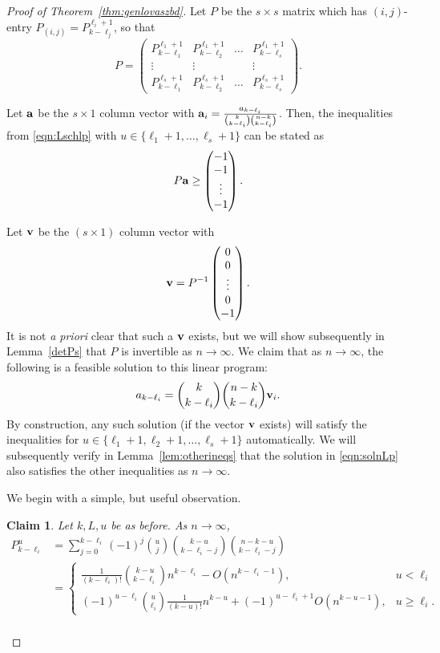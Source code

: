 \documentclass[11pt]{article}
\newtheorem{claim}[theorem]{Claim}
\theoremstyle{definition}
\theoremstyle{remark}
\begin{document}
\begin{proof}[Proof of Theorem~\ref{thm:genlovaszbd}]
Let $P$ be the $s\times{s}$ matrix which has $(i, j)$-entry $P_{(i, j)} = P_{k-\ell_j}^{\ell_{i}+1}$, so that \[P = \begin{pmatrix}P_{k-\ell_1}^{\ell_1+1} & P_{k-\ell_2}^{\ell_1+1}  & \ldots & P_{k-\ell_s}^{\ell_1+1} \\ \vdots & \vdots & &\vdots \\ P_{k-\ell_1}^{\ell_s+1} & P_{k-\ell_2}^{\ell_s+1} & \ldots  & P_{k-\ell_s}^{\ell_s+1}\end{pmatrix}.\]

Let ${\bf a}$ be the $s\times 1$ column vector with ${\bf a}_{i} = \frac{a_{k-\ell_i}}{\binom{k}{k-\ell_i}\binom{n-k}{k-\ell_i}}$.  Then, the inequalities from \eqref{eqn:Lschlp} with $u\in \{\ell_1+1, \ldots, \ell_s+1\}$ can be stated as 
\[P{\bf a} \ge \begin{pmatrix}-1 \\ -1 \\ \vdots \\ -1\end{pmatrix}.\]

Let ${\bf v}$ be the $(s\times 1)$ column vector with 
\[{\bf v} = P^{-1}\begin{pmatrix}0 \\ 0 \\ \vdots \\ 0 \\ -1\end{pmatrix}.\]
It is not \emph{a priori} clear that such a ${\bf v}$ exists, but we will show subsequently in Lemma~\ref{detPs} that $P$ is invertible as $n\rightarrow \infty$. 
We claim that as $n\rightarrow \infty$, the following is a feasible solution to this linear program:
\begin{equation}\label{eqn:solnLp}
a_{k-\ell_i} = \binom{k}{k-\ell_i}\binom{n-k}{k-\ell_i}{\bf v}_i. 
\end{equation}
By construction, any such solution (if the vector ${\bf v}$ exists) will satisfy the inequalities for $u\in \{\ell_1+1, \ell_2+1, \ldots, \ell_s+1\}$ automatically. We will subsequently verify in Lemma~\ref{lem:otherineqs} that the solution in \eqref{eqn:solnLp} also satisfies the other inequalities as $n\rightarrow \infty$. 

We begin with a simple, but useful observation. 
\begin{claim}\label{clm:Pordmag}
Let $k, L, u$ be as before. As $n\rightarrow \infty$, 
\begin{align*}
P_{k-\ell_i}^u &= \sum_{j=0}^{k-\ell_i}(-1)^j\binom{u}{j}\binom{k-u}{k-\ell_i-j}\binom{n-k-u}{k-\ell_i-j}\\
& = \begin{cases}\frac{1}{(k-\ell_i)!}\binom{k-u}{k-\ell_i}n^{k-\ell_i} - O(n^{k-\ell_i-1}),& u < \ell_i \\ (-1)^{u-\ell_i}\binom{u}{\ell_i}\frac{1}{(k-u)!}n^{k-u} + (-1)^{u-\ell_i+1}O(n^{k-u-1}), & u\ge \ell_i.\end{cases}\\
\end{align*}


\end{claim}
\end{proof}
\end{document}
